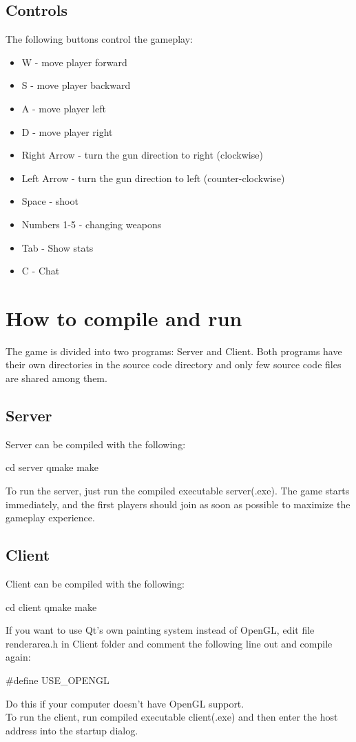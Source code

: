 \documentclass[a4paper,12pt,titlepage]{article}
\begin{document}
\subsection{Controls}
The following buttons control the gameplay:
\begin{itemize}
\item W - move player forward
\item S - move player backward
\item A - move player left
\item D - move player right
\item Right Arrow - turn the gun direction to right (clockwise)
\item Left Arrow - turn the gun direction to left (counter-clockwise)
\item Space - shoot
\item Numbers 1-5 - changing weapons
\item Tab - Show stats
\item C - Chat
\end{itemize}

\section{How to compile and run}

The game is divided into two programs: Server and Client. Both programs have their own directories in the source code directory and only few source code files are shared among them.

\subsection{Server}

Server can be compiled with the following:
    \begin{verbatimtab}[3]
        cd server
        qmake
        make
    \end{verbatimtab}

To run the server, just run the compiled executable server(.exe). The game starts immediately, and the first players should join as soon as possible to maximize the gameplay experience.

\subsection{Client}

Client can be compiled with the following:
    \begin{verbatimtab}[3]
        cd client
        qmake
        make
    \end{verbatimtab}
If you want to use Qt's own painting system instead of OpenGL, edit file renderarea.h in Client folder and comment the following line out and compile again: 
    \begin{verbatimtab}[3]
        #define USE_OPENGL
    \end{verbatimtab}
Do this if your computer doesn't have OpenGL support.\\
To run the client, run compiled executable client(.exe) and then enter the host address into the startup dialog.
\end{document}
